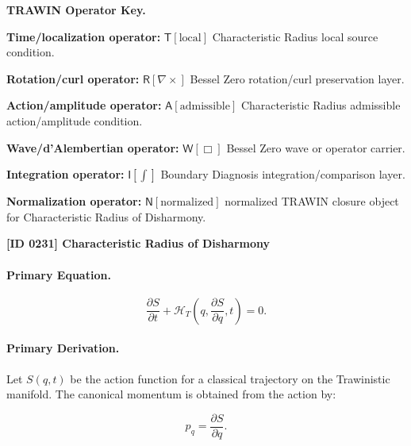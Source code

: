\par\vspace{0.45\baselineskip}
\noindent\begin{minipage}[t]{\linewidth}
\begingroup
\small
\raggedright
\textbf{TRAWIN Operator Key.}\par
\noindent\textbf{Time/localization operator:} $\mathsf{T}\!\left[\mathrm{local}\right]$ Characteristic Radius local source condition.\par
\noindent\textbf{Rotation/curl operator:} $\mathsf{R}\!\left[\nabla\times\right]$ Bessel Zero rotation/curl preservation layer.\par
\noindent\textbf{Action/amplitude operator:} $\mathsf{A}\!\left[\mathrm{admissible}\right]$ Characteristic Radius admissible action/amplitude condition.\par
\noindent\textbf{Wave/d'Alembertian operator:} $\mathsf{W}\!\left[\Box\right]$ Bessel Zero wave or operator carrier.\par
\noindent\textbf{Integration operator:} $\mathsf{I}\!\left[\int\right]$ Boundary Diagnosis integration/comparison layer.\par
\noindent\textbf{Normalization operator:} $\mathsf{N}\!\left[\mathrm{normalized}\right]$ normalized TRAWIN closure object for Characteristic Radius of Disharmony.\par
\endgroup
\end{minipage}

\clearpage
\noindent\textbf{[ID 0231] Characteristic Radius of Disharmony}\par
\vspace{0.35em}
\paragraph{Primary Equation.}
\begin{equation}
\frac{\partial S}{\partial t}
+
\mathcal{H}_T
\left(
q,\frac{\partial S}{\partial q},t
\right)
=
0 .
\end{equation}

\paragraph{Primary Derivation.}
Let $S(q,t)$ be the action function for a classical trajectory on the Trawinistic manifold.  
The canonical momentum is obtained from the action by:

\begin{equation}
p_q=\frac{\partial S}{\partial q}.
\end{equation}


